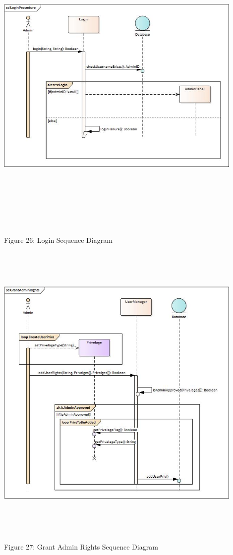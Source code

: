     \includegraphics[width=12cm,height=15cm,keepaspectratio]{admin_ui/images/sequence_diagrams/LoginProcedure.jpg}
		\begin{center}
	    \small{Figure 26: Login Sequence Diagram}
    \end{center}
    
    \includegraphics[width=12cm,height=15cm,keepaspectratio]{admin_ui/images/sequence_diagrams/GrantAdminRights.jpg}
		\begin{center}
	    \small{Figure 27: Grant Admin Rights Sequence Diagram}
    \end{center}
    
